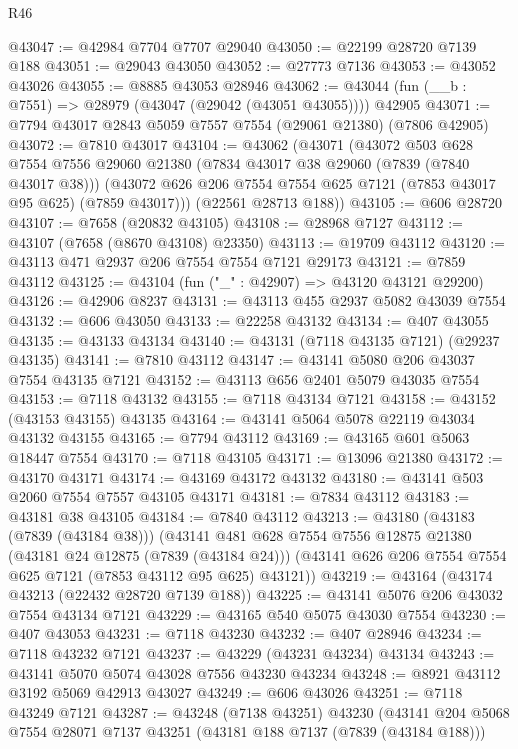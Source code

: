 \begin{lexlean}{R46}
\begin{coremodule}
@43047 := @42984 @7704 @7707 @29040
@43050 := @22199 @28720 @7139 @188
@43051 := @29043 @43050
@43052 := @27773 @7136
@43053 := @43052 @43026
@43055 := @8885 @43053 @28946
@43062 := @43044 (fun (__b : @7551) => @28979 (@43047 (@29042 (@43051 @43055)))) @42905
@43071 := @7794 @43017 @2843 @5059 @7557 @7554 (@29061 @21380) (@7806 @42905)
@43072 := @7810 @43017
@43104 := @43062
    (@43071
      (@43072
        @503
        @628
        @7554
        @7556
        @29060
        @21380
        (@7834 @43017 @38 @29060 (@7839 (@7840 @43017 @38)))
        (@43072 @626 @206 @7554 @7554 @625 @7121 (@7853 @43017 @95 @625) (@7859 @43017)))
      (@22561 @28713 @188))
@43105 := @606 @28720
@43107 := @7658 (@20832 @43105)
@43108 := @28968 @7127
@43112 := @43107 (@7658 (@8670 @43108) @23350)
@43113 := @19709 @43112
@43120 := @43113 @471 @2937 @206 @7554 @7554 @7121 @29173
@43121 := @7859 @43112
@43125 := @43104 (fun ("_" : @42907) => @43120 @43121 @29200)
@43126 := @42906 @8237
@43131 := @43113 @455 @2937 @5082 @43039 @7554
@43132 := @606 @43050
@43133 := @22258 @43132
@43134 := @407 @43055
@43135 := @43133 @43134
@43140 := @43131 (@7118 @43135 @7121) (@29237 @43135)
@43141 := @7810 @43112
@43147 := @43141 @5080 @206 @43037 @7554 @43135 @7121
@43152 := @43113 @656 @2401 @5079 @43035 @7554
@43153 := @7118 @43132
@43155 := @7118 @43134 @7121
@43158 := @43152 (@43153 @43155) @43135
@43164 := @43141 @5064 @5078 @22119 @43034 @43132 @43155
@43165 := @7794 @43112
@43169 := @43165 @601 @5063 @18447 @7554
@43170 := @7118 @43105
@43171 := @13096 @21380
@43172 := @43170 @43171
@43174 := @43169 @43172 @43132
@43180 := @43141 @503 @2060 @7554 @7557 @43105 @43171
@43181 := @7834 @43112
@43183 := @43181 @38 @43105
@43184 := @7840 @43112
@43213 := @43180
    (@43183 (@7839 (@43184 @38)))
    (@43141
      @481
      @628
      @7554
      @7556
      @12875
      @21380
      (@43181 @24 @12875 (@7839 (@43184 @24)))
      (@43141 @626 @206 @7554 @7554 @625 @7121 (@7853 @43112 @95 @625) @43121))
@43219 := @43164 (@43174 @43213 (@22432 @28720 @7139 @188))
@43225 := @43141 @5076 @206 @43032 @7554 @43134 @7121
@43229 := @43165 @540 @5075 @43030 @7554
@43230 := @407 @43053
@43231 := @7118 @43230
@43232 := @407 @28946
@43234 := @7118 @43232 @7121
@43237 := @43229 (@43231 @43234) @43134
@43243 := @43141 @5070 @5074 @43028 @7556 @43230 @43234
@43248 := @8921 @43112 @3192 @5069 @42913 @43027
@43249 := @606 @43026
@43251 := @7118 @43249 @7121
@43287 := @43248
    (@7138 @43251)
    @43230
    (@43141
      @204
      @5068
      @7554
      @28071
      @7137
      @43251
      (@43181 @188 @7137 (@7839 (@43184 @188)))

\end{coremodule}
\end{lexlean}
